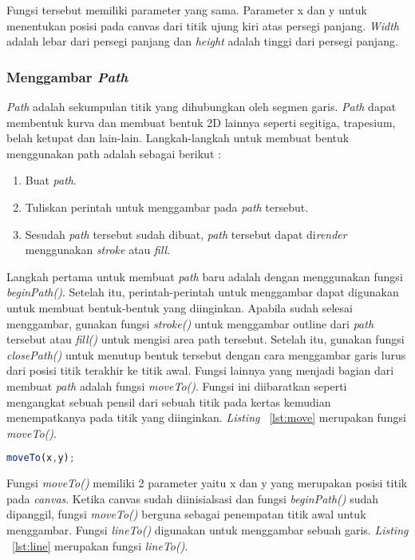 Fungsi tersebut memiliki parameter yang sama. Parameter x dan y untuk menentukan posisi pada canvas dari titik ujung kiri atas persegi panjang. \textit{Width} adalah lebar dari persegi panjang dan \textit{height} adalah tinggi dari persegi panjang.

\subsubsection{Menggambar \textit{Path}}
\textit{Path} adalah sekumpulan titik yang dihubungkan oleh segmen garis. \textit{Path} dapat membentuk kurva dan membuat bentuk 2D lainnya seperti segitiga, trapesium, belah ketupat dan lain-lain. Langkah-langkah untuk membuat bentuk menggunakan path adalah sebagai berikut : 

\begin{enumerate}
	\item Buat \textit{path}.
	\item Tuliskan perintah untuk menggambar pada \textit{path} tersebut.
	\item Sesudah \textit{path} tersebut sudah dibuat, \textit{path} tersebut dapat di\textit{render} menggunakan \textit{stroke} atau \textit{fill}.
\end{enumerate}

Langkah pertama untuk membuat \textit{path} baru adalah dengan menggunakan fungsi \textit{beginPath()}. Setelah itu, perintah-perintah untuk menggambar dapat digunakan untuk membuat bentuk-bentuk yang diinginkan. Apabila sudah selesai menggambar, gunakan fungsi \textit{stroke()} untuk menggambar outline dari \textit{path} tersebut atau \textit{fill()} untuk mengisi area path tersebut. Setelah itu, gunakan fungsi \textit{closePath()} untuk menutup bentuk tersebut dengan cara menggambar garis lurus dari posisi titik terakhir ke titik awal. Fungsi lainnya yang menjadi bagian dari membuat \textit{path} adalah fungsi \textit{moveTo()}. Fungsi ini diibaratkan seperti mengangkat sebuah pensil dari sebuah titik pada kertas kemudian menempatkanya pada titik yang diinginkan. \textit{Listing} ~\ref{lst:move} merupakan fungsi \textit{moveTo()}.

\begin{lstlisting}[language=Javascript, caption=Fungsi \textit{moveTo()}, label={lst:move}]
	moveTo(x,y);
\end{lstlisting}

Fungsi \textit{moveTo()} memiliki 2 parameter yaitu x dan y yang merupakan posisi titik pada \textit{canvas}. Ketika canvas sudah diinisialsasi dan fungsi \textit{beginPath()} sudah dipanggil, fungsi \textit{moveTo()} berguna sebagai penempatan titik awal untuk menggambar. Fungsi \textit{lineTo()} digunakan untuk menggambar sebuah garis. \textit{Listing} ~\ref{lst:line} merupakan fungsi \textit{lineTo()}.

